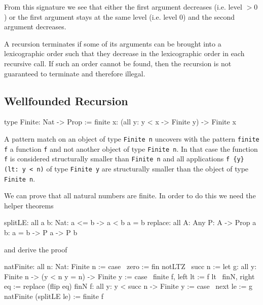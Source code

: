 From this signature we see that either the first argument decreases (i.e. level
$> 0$) or the first argument stays at the same level (i.e. level $0$) and the
second argument decreases.

A recursion terminates if some of its arguments can be brought into a
lexicographic order such that they decrease in the lexicographic order in each
recursive call. If such an order cannot be found, then the recursion is not
guaranteed to terminate and therefore illegal.






\subsection{Wellfounded Recursion}

\begin{alba}
    type Finite: Nat -> Prop :=
        finite {x}: (all {y}: y < x -> Finite y) -> Finite x
\end{alba}

A pattern match on an object of type \lstinline!Finite n! uncovers with the
pattern \lstinline!finite f! a function \lstinline!f! and not another object of
type \lstinline!Finite n!. In that case the function \lstinline!f! is considered
structurally smaller than \lstinline!Finite n! and all applications
\lstinline!f {y} (lt: y < n)! of type \lstinline!Finite y! are structurally
smaller than the object of type \lstinline!Finite n!.

We can prove that all natural numbers are finite. In order to do this we need
the helper theorems
%
\begin{alba}
    splitLE: all {a b: Nat}: a <= b  ->  a < b \/ a = b
    replace: all {A: Any} {P: A -> Prop} {a b}: a = b -> P a -> P b
\end{alba}
%
and derive the proof
%
\begin{alba}
    natFinite: all {n: Nat}: Finite n := case
        \ {zero}   := fin notLTZ
        \ {succ n} :=
            let
                g: all {y}: Finite n -> (y < n \/ y = n) -> Finite y := case
                    \ finite f, left  lt   := f lt
                    \ finN,     right eq   := replace (flip eq) finN
                f: all {y}: y < succ n -> Finite y := case
                    \ next le :=
                        g natFinite (splitLE le)
            :=
                finite f
\end{alba}

